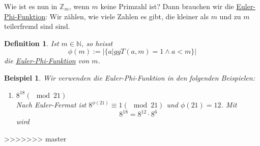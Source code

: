 \documentclass{report}
\newtheorem{mydef}{Definition}
\newtheorem{myexample}{Beispiel}
\begin{document}
Wie ist es nun in $\mathbb{Z}_m$, wenn $m$ keine Primzahl ist? Dann brauchen wir die \underline{Euler-Phi-Funktion}:
Wir zählen, wie viele Zahlen es gibt, die kleiner als $m$ und zu $m$ teilerfremd sind sind.
\begin{mydef}Ist $m \in \mathbb{N}$, so heisst
\begin{equation}\phi (m) := |\{a | ggT(a,m) = 1 \land a < m\}|\end{equation}
die \underline{Euler-Phi-Funktion} von $m$.\end{mydef}
\begin{myexample}Wir verwenden die Euler-Phi-Funktion in den folgenden Beispielen:\begin{enumerate}
\item $8^{18} (\mod{21})$\\
Nach Euler-Fermat ist $8^{\phi(21)} \equiv 1 (\mod{21})$ und $\phi(21) = 12$. Mit
\begin{equation}8^{18} = 8^{12} \cdot 8^6\end{equation}
wird
\end{enumerate}\end{myexample}

>>>>>>> master
\end{document}
